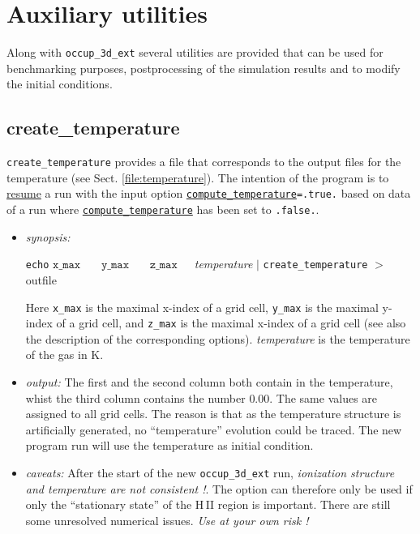 \documentclass[a4paper,10pt]{article}
\begin{document}
\section{Auxiliary utilities}
Along with \texttt{occup\_3d\_ext} several utilities are provided that can 
be used for benchmarking purposes, postprocessing of the simulation results and 
to modify the initial conditions.

\subsection{create\_temperature}
\label{util:createtemperature}
\texttt{create\_temperature} provides a file that corresponds to the output 
files for the temperature (see Sect. \ref{file:temperature}). The intention of 
the program is to \hyperref[sec:commandlineoptions]{resume} a run with the 
input option 
\texttt{\hyperref[opt:computetemperature]{compute\_temperature}=.true.} based on 
data of a run where 
\texttt{\hyperref[opt:computetemperature]{compute\_temperature}} has been set 
to \texttt{.false.}.
\begin{itemize}
 \item \textit{synopsis:}
 \begin{center}
   \texttt{echo} $\mathtt{\hyperref[opt:xmax]{x\_max}}$~~~
                 $\mathtt{\hyperref[opt:ymax]{y\_max}}$~~~
                 $\mathtt{\hyperref[opt:zmax]{z\_max}}$~~~\textit{temperature} 
                  $|$
                 \texttt{create\_temperature} $>$ outfile
 \end{center} 
 Here \texttt{x\_max} is the maximal x-index of a grid cell, \texttt{y\_max} is 
 the maximal y-index of a grid cell, and \texttt{z\_max} is the maximal x-index 
 of a grid cell (see also the description of the corresponding options). 
 \textit{temperature} is the temperature of the gas in K.

\item \textit{output:}
 The first and the second column both contain in the temperature, whist the 
 third column contains the number $0.00$. The same values are assigned to all 
 grid cells. The reason is that as the temperature structure is artificially 
 generated, no  ``temperature'' evolution could be traced. The new program run 
 will use the temperature as  initial condition.  

\item \textit{caveats:} 
 After the start of the new \texttt{occup\_3d\_ext} run,  \textit{ionization 
 structure and temperature are not consistent !}. The option can therefore only 
 be used if only the ``stationary state'' of the H\,II region is important.  
 There are still some unresolved numerical issues. \textit{Use at your 
 own risk !}
\end{itemize}
\end{document}
